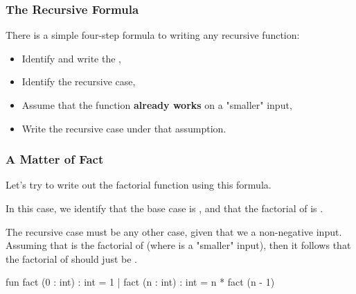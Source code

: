 \documentclass[aspectratio=169]{beamer}
\begin{document}
\begin{frame}[fragile]
  \frametitle{The Recursive Formula}

  There is a simple four-step formula to writing any recursive function:

  \vspace{5pt}

  \begin{itemize}
    \item Identify and write the ,
    \item Identify the recursive case, 
    \item Assume that the function \textbf{already works} on a "smaller" input,
    \item Write the recursive case under that assumption.
  \end{itemize}

  \vspace{\fill}

\end{frame}

\begin{frame}[fragile]
  \frametitle{A Matter of Fact}

  Let's try to write out the factorial function using this formula. 

  \vspace{\fill}

  In this case, we identify that the base case is , and that
  the factorial of  is . 

  \vspace{10pt}

  The recursive case must be any other case, given that we 
  a non-negative input. Assuming that  is the factorial of
   (where  is a "smaller" input), then it follows that 
  the factorial of  should just be .

  \vspace{\fill}

  \begin{codeblock}
    fun fact (0 : int) : int = 1 
      | fact (n : int) : int = n * fact (n - 1)
  \end{codeblock}
\end{frame}
\end{document}
